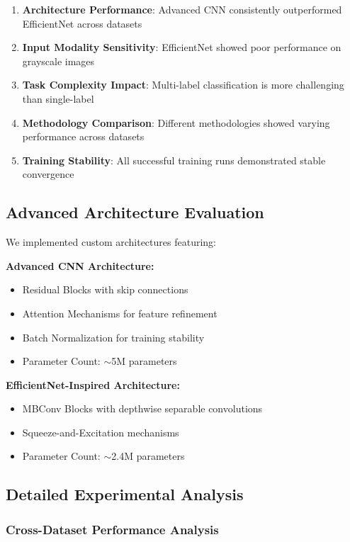 \documentclass[12pt,a4paper]{article}
\begin{document}
\begin{enumerate}
    \item \textbf{Architecture Performance}: Advanced CNN consistently outperformed EfficientNet across datasets
    \item \textbf{Input Modality Sensitivity}: EfficientNet showed poor performance on grayscale images
    \item \textbf{Task Complexity Impact}: Multi-label classification is more challenging than single-label
    \item \textbf{Methodology Comparison}: Different methodologies showed varying performance across datasets
    \item \textbf{Training Stability}: All successful training runs demonstrated stable convergence
\end{enumerate}

\subsection{Advanced Architecture Evaluation}

We implemented custom architectures featuring:

\textbf{Advanced CNN Architecture:}
\begin{itemize}
    \item Residual Blocks with skip connections
    \item Attention Mechanisms for feature refinement
    \item Batch Normalization for training stability
    \item Parameter Count: $\sim$5M parameters
\end{itemize}

\textbf{EfficientNet-Inspired Architecture:}
\begin{itemize}
    \item MBConv Blocks with depthwise separable convolutions
    \item Squeeze-and-Excitation mechanisms
    \item Parameter Count: $\sim$2.4M parameters
\end{itemize}

\subsection{Detailed Experimental Analysis}

\subsubsection{Cross-Dataset Performance Analysis}
\end{document}
